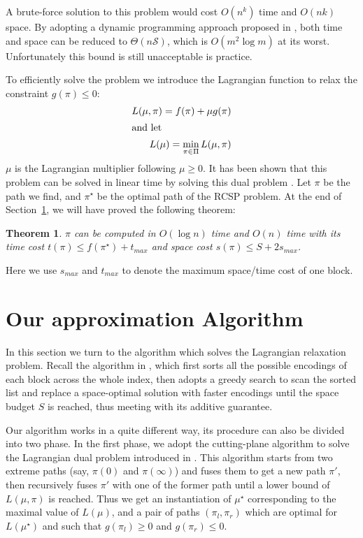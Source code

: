 \documentclass{sig-alternate-05-2015}
\begin{document}
A brute-force solution to this problem would cost $ O(n^k) $ time and $ O(nk) $ space.
By adopting a dynamic programming approach proposed in \cite{lawler2001combinatorial}, both time and space can be reduced to $ \Theta(n\mathcal{S}) $, which is $ O(m^{2}\log m) $ at its worst.
Unfortunately this bound is still unacceptable is practice.

To efficiently solve the problem we introduce the Lagrangian function to relax the constraint $ g(\pi) \leqslant 0 $:
\begin{align}
L(\mu,\pi) = f(\pi)+\mu g(\pi) \label{equ: L(u,pi)} \\ 
\intertext{and let}
L(\mu) = \min_{\pi \in \Pi} L(\mu,\pi) \label{equ: L(u)}
\end{align}
\noindent $ \mu $ is the Lagrangian multiplier following $ \mu \geqslant 0 $.
It has been shown that this problem can be solved in linear time by solving this dual problem \cite{handler1980dual}.
Let $ \pi $ be the path we find, and $ \pi^\star $ be the optimal path of the RCSP problem.
At the end of Section~\ref{sec: our alg}, we will have proved the following theorem:
\newtheorem{theorem}{Theorem}
\begin{theorem}
	$ \pi $ can be computed in $ O(\log n) $ time and $ O(n) $ time with its time cost $ t(\pi) \leqslant f(\pi^\star) + t_{max} $ and space cost $ s(\pi) \leqslant S + 2s_{max} $.
\end{theorem}
Here we use $ s_{max} $ and $ t_{max} $ to denote the maximum space/time cost of one block.

\section{Our approximation Algorithm}\label{sec: our alg}
In this section we turn to the algorithm which solves the Lagrangian relaxation problem.
Recall the algorithm in \cite{ottaviano2015optimal}, which first sorts all the possible encodings of each block across the whole index, then adopts a greedy search to scan the sorted list and replace a space-optimal solution with faster encodings until the space budget $ S $ is reached, thus meeting with its additive guarantee.

Our algorithm works in a quite different way, its procedure can also be divided into two phase.
In the first phase, we adopt the cutting-plane algorithm to solve the Lagrangian dual problem introduced in \cite{handler1980dual}.
This algorithm starts from two extreme paths (say, $ \pi(0) $ and $ \pi(\infty) $) and fuses them to get a new path $ \pi' $, then recursively fuses $ \pi' $ with one of the former path until
a lower bound of $ L(\mu,\pi) $ is reached.
Thus we get an instantiation of $ \mu^\star $ corresponding to the maximal value of $ L(\mu) $, and a pair of paths $ (\pi_l,\pi_r) $ which are optimal for $ L(\mu^\star) $ and such that $ g(\pi_l) \geqslant 0 $ and $ g(\pi_r) \leqslant 0 $.
\end{document}
